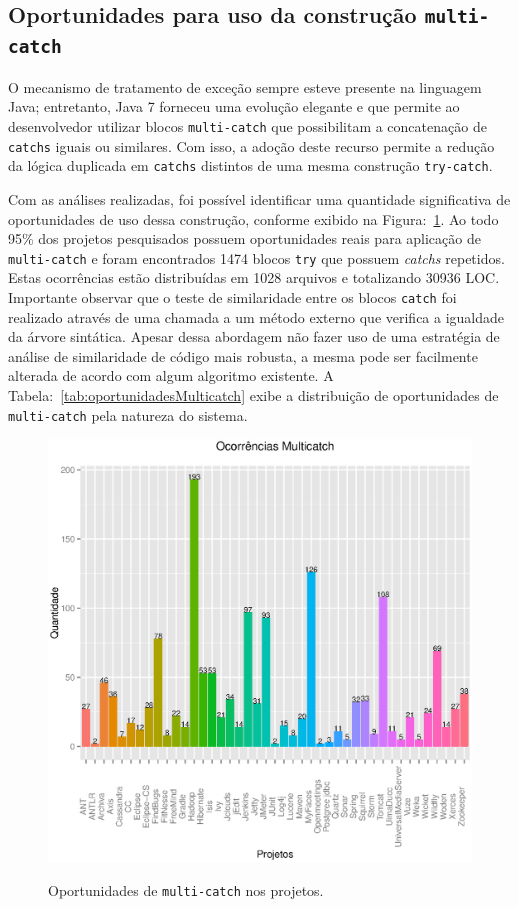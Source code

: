 \subsection{Oportunidades para uso da constru\c c\~{a}o \texttt{multi-catch}}

O mecanismo de tratamento de exceção sempre esteve 
presente na linguagem Java; entretanto, Java 7 forneceu uma 
evolução elegante e que permite ao desenvolvedor utilizar blocos \texttt{multi-catch} que possibilitam 
a concatenação de \texttt{catchs} iguais ou similares. Com isso, a adoção deste 
recurso permite a redução da lógica duplicada 
em \texttt{catchs} distintos de uma mesma construção \texttt{try-catch}.

Com as análises realizadas, foi possível identificar uma quantidade significativa de oportunidades 
de uso dessa construção, conforme exibido na Figura:~\ref{fig:Muticatch}. Ao todo \num{95}\% dos projetos pesquisados possuem oportunidades reais para aplicação de \texttt{multi-catch} e
foram encontrados \num{1474} blocos \texttt{try} que possuem \textit{catchs} repetidos. 
Estas ocorrências estão distribuídas em \num{1028} arquivos e totalizando \num{30936} \acs{LOC}. 
Importante observar que o teste de  similaridade entre os blocos \texttt{catch} 
foi realizado através de uma chamada a um método externo que verifica a igualdade da árvore 
sintática. Apesar dessa abordagem não fazer uso de uma estratégia de análise 
de similaridade de código mais robusta, a mesma pode ser facilmente alterada de 
acordo com algum algoritmo existente. A Tabela:~\ref{tab:oportunidadesMulticatch} exibe a distribuição de oportunidades de \texttt{multi-catch} pela natureza do sistema.

\begin{figure}[h]
	\center
	\includegraphics[scale=0.75]{Imagens/ocorrenciasMulticatch}
	\label{fig:Muticatch}
	\caption{Oportunidades de \texttt{multi-catch} nos projetos.}
\end{figure}
	

